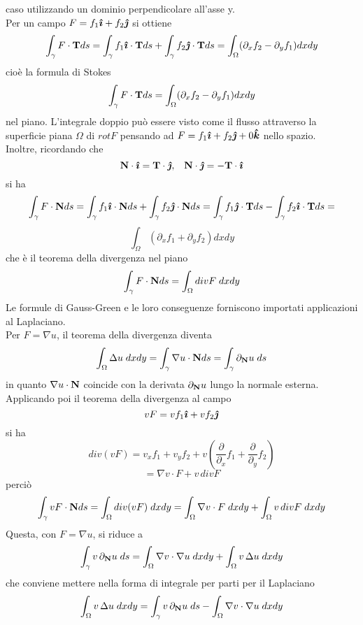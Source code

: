 caso utilizzando un dominio perpendicolare all'asse y.\\
Per un campo $F= f_1 \boldsymbol{\hat{\imath}} + f_2 \boldsymbol{\hat{\jmath}}$ si ottiene
\[
	\int_{\gamma} F \cdot {\bf T} ds
	= \int_{\gamma} f_1 \boldsymbol{\hat{\imath}} \cdot {\bf T} ds
	+ \int_{\gamma} f_2 \boldsymbol{\hat{\jmath}} \cdot {\bf T} ds
	= \int_{\Omega} (\partial_x f_2 - \partial_y f_1)dxdy
\]
cio\`e la formula di Stokes
\[
	\int_{\gamma} F \cdot {\bf T} ds
	= \int_{\Omega} (\partial_x f_2 - \partial_y f_1)dxdy
\]
nel piano. L'integrale doppio pu\`o essere visto come il flusso attraverso la
superficie piana $\Omega$ di $rot F$ pensando ad $F= f_1 \boldsymbol{\hat{\imath}} + f_2 \boldsymbol{\hat{\jmath}} +0\boldsymbol{\hat{k}}$
nello spazio.\\
Inoltre, ricordando che
\[
	{\bf N} \cdot \boldsymbol{\hat{\imath}}= {\bf T} \cdot \boldsymbol{\hat{\jmath}}, \;\;\;
	{\bf N} \cdot \boldsymbol{\hat{\jmath}}= -{\bf T} \cdot \boldsymbol{\hat{\imath}}
\]
si ha
\[
	\int_{\gamma} F \cdot {\bf N} ds=
	\int_{\gamma} f_1 \boldsymbol{\hat{\imath}} \cdot {\bf N} ds +
	\int_{\gamma} f_2 \boldsymbol{\hat{\jmath}} \cdot {\bf N} ds =
	\int_{\gamma} f_1 \boldsymbol{\hat{\jmath}} \cdot {\bf T} ds -
	\int_{\gamma} f_2 \boldsymbol{\hat{\imath}} \cdot {\bf T} ds =
\]
\[
	\int_{\Omega} \left( \partial_x f_1 + \partial_y f_2 \right)dxdy
\]
che \`e il teorema della divergenza nel piano
\[
	\int_{\gamma} F \cdot {\bf N} ds=
	\int_{\Omega} div F \; dxdy
\]
Le formule di Gauss-Green e le loro conseguenze forniscono importati
applicazioni
al Laplaciano.\\
Per $F= \nabla u$, il teorema della divergenza diventa
\[
	\int_{\Omega} \Delta u \; dxdy=
	\int_{\gamma} \nabla u \cdot {\bf N} ds =
	\int_{\gamma} \partial_{\bf N} u \; ds
\]
in quanto $\nabla u \cdot {\bf N}$ coincide con la derivata
$ \partial_{\bf N} u$ lungo la normale esterna.\\
Applicando poi il teorema della divergenza al campo
\[
	vF= vf_1 \boldsymbol{\hat{\imath}} + vf_2 \boldsymbol{\hat{\jmath}}
\]
si ha
\[
	div(vF)= v_x f_1 + v_y f_2 +
	v \left( \frac{\partial}{\partial_x} f_1
	+ \frac{\partial}{\partial_y} f_2 \right)
\]
\[
	= \nabla v \cdot F + v\, divF
\]
perci\`o
\[
	\int_{\gamma} vF \cdot {\bf N} ds =
	\int_{\Omega} div(vF) \; dxdy=
	\int_{\Omega} \nabla v \cdot F \; dxdy +
	\int_{\Omega} v\, divF \; dxdy
\]
Questa, con $F= \nabla u$, si riduce a
\[
	\int_{\gamma} v \, \partial_{\bf N} u \; ds =
	\int_{\Omega} \nabla v \cdot \nabla u \; dxdy +
	\int_{\Omega} v\, \Delta u \; dxdy
\]
che conviene mettere nella forma di integrale per parti per il Laplaciano
\[
	\int_{\Omega} v\, \Delta u \; dxdy =
	\int_{\gamma} v \, \partial_{\bf N} u \; ds -
	\int_{\Omega} \nabla v \cdot \nabla u \; dxdy
\]
